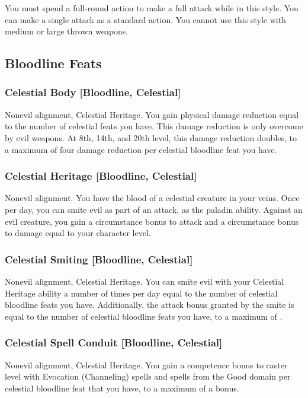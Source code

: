 You must spend a full-round action to make a full attack while in this style. You can make a single attack as a standard action. You cannot use this style with medium or large thrown weapons.

\subsection{Bloodline Feats}

\subsubsection{Celestial Body [Bloodline, Celestial]}
 Nonevil alignment, Celestial Heritage.
 You gain physical damage reduction equal to the number of celestial feats you have. This damage reduction is only overcome by evil weapons. At 8th, 14th, and 20th level, this damage reduction doubles, to a maximum of four damage reduction per celestial bloodline feat you have.

\subsubsection{Celestial Heritage [Bloodline, Celestial]}
 Nonevil alignment.
 You have the blood of a celestial creature in your veins. Once per day, you can smite evil as part of an attack, as the paladin ability. Against an evil creature, you gain a  circumstance bonus to attack and a circumstance bonus to damage equal to your character level.

\subsubsection{Celestial Smiting [Bloodline, Celestial]}
 Nonevil alignment, Celestial Heritage.
 You can smite evil with your Celestial Heritage ability a number of times per day equal to the number of celestial bloodline feats you have. Additionally, the attack bonus granted by the smite is equal to the number of celestial bloodline feats you have, to a maximum of .

\subsubsection{Celestial Spell Conduit [Bloodline, Celestial]}
 Nonevil alignment, Celestial Heritage.
 You gain a  competence bonus to caster level with Evocation (Channeling) spells and spells from the Good domain per celestial bloodline feat that you have, to a maximum of a  bonus.

